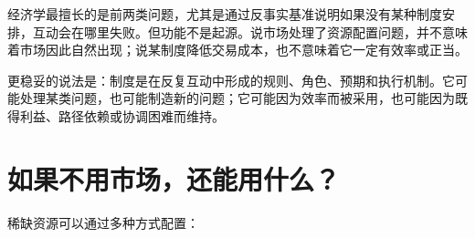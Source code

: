 \documentclass[UTF8,10pt,a4paper,scheme=chinese]{ctexart}
\begin{document}
经济学最擅长的是前两类问题，尤其是通过反事实基准说明如果没有某种制度安排，互动会在哪里失败。但功能不是起源。说市场处理了资源配置问题，并不意味着市场因此自然出现；说某制度降低交易成本，也不意味着它一定有效率或正当。

更稳妥的说法是：制度是在反复互动中形成的规则、角色、预期和执行机制。它可能处理某类问题，也可能制造新的问题；它可能因为效率而被采用，也可能因为既得利益、路径依赖或协调困难而维持。





\section{如果不用市场，还能用什么？}

稀缺资源可以通过多种方式配置：
\end{document}
